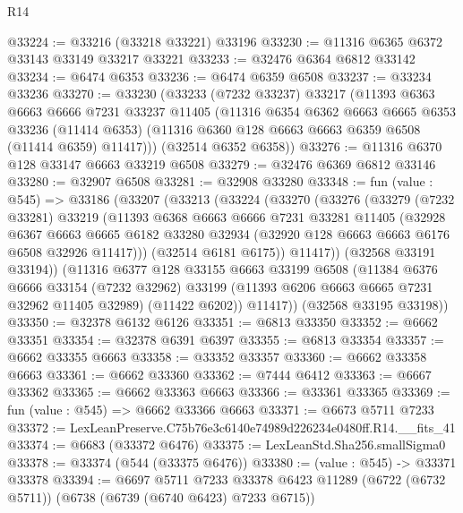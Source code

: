 \begin{lexlean}{R14}
\begin{coremodule}
@33224 := @33216 (@33218 @33221) @33196
@33230 := @11316 @6365 @6372 @33143 @33149 @33217 @33221
@33233 := @32476 @6364 @6812 @33142
@33234 := @6474 @6353
@33236 := @6474 @6359 @6508
@33237 := @33234 @33236
@33270 := @33230
    (@33233
      (@7232 @33237)
      @33217
      (@11393
        @6363
        @6663
        @6666
        @7231
        @33237
        @11405
        (@11316
          @6354
          @6362
          @6663
          @6665
          @6353
          @33236
          (@11414 @6353)
          (@11316 @6360 @128 @6663 @6663 @6359 @6508 (@11414 @6359) @11417)))
      (@32514 @6352 @6358))
@33276 := @11316 @6370 @128 @33147 @6663 @33219 @6508
@33279 := @32476 @6369 @6812 @33146
@33280 := @32907 @6508
@33281 := @32908 @33280
@33348 := fun (value : @545) =>
  @33186
    (@33207
      (@33213
        (@33224
          (@33270
            (@33276
              (@33279
                (@7232 @33281)
                @33219
                (@11393
                  @6368
                  @6663
                  @6666
                  @7231
                  @33281
                  @11405
                  (@32928
                    @6367
                    @6663
                    @6665
                    @6182
                    @33280
                    @32934
                    (@32920 @128 @6663 @6663 @6176 @6508 @32926 @11417)))
                (@32514 @6181 @6175))
              @11417))
          (@32568 @33191 @33194))
        (@11316
          @6377
          @128
          @33155
          @6663
          @33199
          @6508
          (@11384
            @6376
            @6666
            @33154
            (@7232 @32962)
            @33199
            (@11393 @6206 @6663 @6665 @7231 @32962 @11405 @32989)
            (@11422 @6202))
          @11417))
      (@32568 @33195 @33198))
@33350 := @32378 @6132 @6126
@33351 := @6813 @33350
@33352 := @6662 @33351
@33354 := @32378 @6391 @6397
@33355 := @6813 @33354
@33357 := @6662 @33355 @6663
@33358 := @33352 @33357
@33360 := @6662 @33358 @6663
@33361 := @6662 @33360
@33362 := @7444 @6412
@33363 := @6667 @33362
@33365 := @6662 @33363 @6663
@33366 := @33361 @33365
@33369 := fun (value : @545) => @6662 @33366 @6663
@33371 := @6673 @5711 @7233
@33372 := LexLeanPreserve.C75b76e3c6140e74989d226234e0480ff.R14.__fits_41
@33374 := @6683 (@33372 @6476)
@33375 := LexLeanStd.Sha256.smallSigma0
@33378 := @33374 (@544 (@33375 @6476))
@33380 := (value : @545) -> @33371 @33378
@33394 := @6697
    @5711
    @7233
    @33378
    @6423
    @11289
    (@6722 (@6732 @5711))
    (@6738 (@6739 (@6740 @6423) @7233 @6715))

\end{coremodule}
\end{lexlean}
